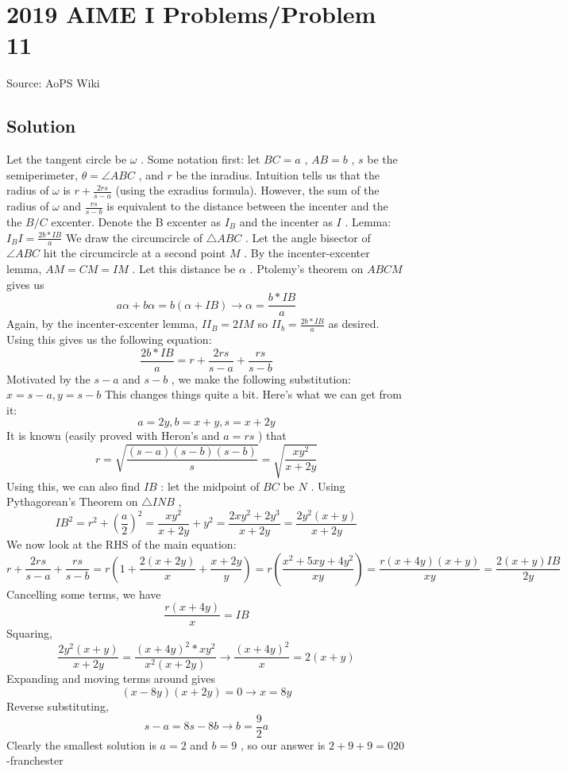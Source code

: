 \documentclass[12pt]{article}
\begin{document}
\section*{{2019 AIME I Problems/Problem 11}}
Source: AoPS Wiki

\subsection*{Solution}
Let the tangent circle be $\omega$ . Some notation first: let $BC=a$ , $AB=b$ , $s$ be the semiperimeter, $\theta=\angle ABC$ , and $r$ be the inradius. Intuition tells us that the radius of $\omega$ is $r+\frac{2rs}{s-a}$ (using the exradius formula). However, the sum of the radius of $\omega$ and $\frac{rs}{s-b}$ is equivalent to the distance between the incenter and the the $B/C$ excenter. Denote the B excenter as $I_B$ and the incenter as $I$ .
Lemma: $I_BI=\frac{2b*IB}{a}$ We draw the circumcircle of $\triangle ABC$ . Let the angle bisector of $\angle ABC$ hit the circumcircle at a second point $M$ . By the incenter-excenter lemma, $AM=CM=IM$ . Let this distance be $\alpha$ . Ptolemy's theorem on $ABCM$ gives us \[a\alpha+b\alpha=b(\alpha+IB)\to \alpha=\frac{b*IB}{a}\] Again, by the incenter-excenter lemma, $II_B=2IM$ so $II_b=\frac{2b*IB}{a}$ as desired.
Using this gives us the following equation: \[\frac{2b*IB}{a}=r+\frac{2rs}{s-a}+\frac{rs}{s-b}\] Motivated by the $s-a$ and $s-b$ , we make the following substitution: $x=s-a, y=s-b$ This changes things quite a bit. Here's what we can get from it: \[a=2y, b=x+y, s=x+2y\] It is known (easily proved with Heron's and $a=rs$ ) that \[r=\sqrt{\frac{(s-a)(s-b)(s-b)}{s}}=\sqrt{\frac{xy^2}{x+2y}}\] Using this, we can also find $IB$ : let the midpoint of $BC$ be $N$ . Using Pythagorean's Theorem on $\triangle INB$ , \[IB^2=r^2+(\frac{a}{2})^2=\frac{xy^2}{x+2y}+y^2=\frac{2xy^2+2y^3}{x+2y}=\frac{2y^2(x+y)}{x+2y}\] We now look at the RHS of the main equation: \[r+\frac{2rs}{s-a}+\frac{rs}{s-b}=r(1+\frac{2(x+2y)}{x}+\frac{x+2y}{y})=r(\frac{x^2+5xy+4y^2}{xy})=\frac{r(x+4y)(x+y)}{xy}=\frac{2(x+y)IB}{2y}\] Cancelling some terms, we have \[\frac{r(x+4y)}{x}=IB\] Squaring, \[\frac{2y^2(x+y)}{x+2y}=\frac{(x+4y)^2*xy^2}{x^2(x+2y)}\to \frac{(x+4y)^2}{x}=2(x+y)\] Expanding and moving terms around gives \[(x-8y)(x+2y)=0\to x=8y\] Reverse substituting, \[s-a=8s-8b\to b=\frac{9}{2}a\] Clearly the smallest solution is $a=2$ and $b=9$ , so our answer is $2+9+9=\boxed{020}$ -franchester
\end{document}
